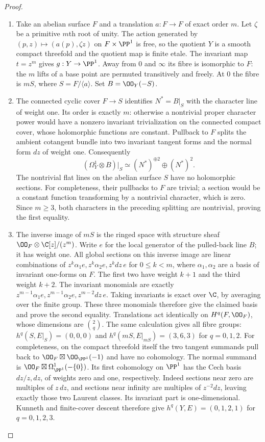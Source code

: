 \begin{proof}

\begin{enumerate}[label={$\langle1\rangle$\arabic*.},leftmargin=*]
\item Take an abelian surface $F$ and a translation $a:F\to F$ of exact order $m$. Let $\zeta$ be a primitive $m$th root of unity. The action generated by $(p,z)\mapsto(a(p),\zeta z)$ on $F\times\PP^1$ is free, so the quotient $Y$ is a smooth compact threefold and the quotient map is finite etale. The invariant map $t=z^m$ gives $g:Y\to\PP^1$. Away from $0$ and $\infty$ its fibre is isomorphic to $F$: the $m$ lifts of a base point are permuted transitively and freely. At $0$ the fibre is $mS$, where $S=F/\langle a\rangle$. Set $B=\OO_Y(-S)$.

\item The connected cyclic cover $F\to S$ identifies $N^*=B|_S$ with the character line of weight one. Its order is exactly $m$: otherwise a nontrivial proper character power would have a nonzero invariant trivialization on the connected compact cover, whose holomorphic functions are constant. Pullback to $F$ splits the ambient cotangent bundle into two invariant tangent forms and the normal form $dz$ of weight one. Consequently
\[
 (\Omega_Y^1\otimes B)|_S\simeq (N^*)^{\oplus2}\oplus(N^*)^2.
\]
The nontrivial flat lines on the abelian surface $S$ have no holomorphic sections. For completeness, their pullbacks to $F$ are trivial; a section would be a constant function transforming by a nontrivial character, which is zero. Since $m\ge3$, both characters in the preceding splitting are nontrivial, proving the first equality.

\item The inverse image of $mS$ is the ringed space with structure sheaf $\OO_F\otimes\C[z]/(z^m)$. Write $e$ for the local generator of the pulled-back line $B$; it has weight one. All global sections on this inverse image are linear combinations of $z^k\alpha_1e,z^k\alpha_2e,z^kdz\,e$ for $0\le k<m$, where $\alpha_1,\alpha_2$ are a basis of invariant one-forms on $F$. The first two have weight $k+1$ and the third weight $k+2$. The invariant monomials are exactly
$z^{m-1}\alpha_1e,z^{m-1}\alpha_2e,z^{m-2}dz\,e$.
Taking invariants is exact over $\C$, by averaging over the finite group. These three monomials therefore give the claimed basis and prove the second equality. Translations act identically on $H^q(F,\OO_F)$, whose dimensions are $\binom{2}{q}$. The same calculation gives all fibre groups: $h^q(S,E|_S)=(0,0,0)$ and $h^q(mS,E|_{mS})=(3,6,3)$ for $q=0,1,2$. For completeness, on the compact threefold itself the two tangent summands pull back to $\OO_F\boxtimes\OO_{\PP^1}(-1)$ and have no cohomology. The normal summand is $\OO_F\boxtimes\Omega^1_{\PP^1}(-\{0\})$. Its first cohomology on $\PP^1$ has the Cech basis $dz/z,dz$, of weights zero and one, respectively. Indeed sections near zero are multiples of $z\,dz$, and sections near infinity are multiples of $z^{-2}dz$, leaving exactly those two Laurent classes. Its invariant part is one-dimensional. Kunneth and finite-cover descent therefore give $h^q(Y,E)=(0,1,2,1)$ for $q=0,1,2,3$.

\end{enumerate}
\end{proof}
